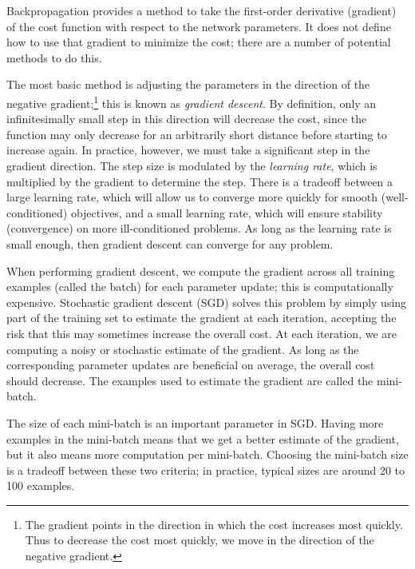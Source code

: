 Backpropagation provides a method to take the first-order derivative (gradient)
of the cost function with respect to the network parameters.
It does not define how to use that gradient to minimize the cost;
there are a number of potential methods to do this.

The most basic method is adjusting the parameters
in the direction of the negative gradient;\footnote{
  The gradient points in the direction in which the cost increases most quickly.
  Thus to decrease the cost most quickly,
  we move in the direction of the negative gradient.}
this is known as \emph{gradient descent}.
By definition, only an infinitesimally small step in this direction
will decrease the cost,
since the function may only decrease for an arbitrarily short distance
before starting to increase again.
In practice, however, we must take a significant step in the gradient direction.
The step size is modulated by the \emph{learning rate},
which is multiplied by the gradient to determine the step.
There is a tradeoff between a large learning rate,
which will allow us to converge more quickly for smooth (well-conditioned) objectives,
and a small learning rate,
which will ensure stability (convergence) on more ill-conditioned problems.
As long as the learning rate is small enough,
then gradient descent can converge for any problem.

When performing gradient descent,
we compute the gradient across all training examples (called the batch)
for each parameter update;
this is computationally expensive.
Stochastic gradient descent (SGD) solves this problem by simply
using part of the training set to estimate the gradient at each iteration,
accepting the risk that this may sometimes increase the overall cost.
At each iteration, we are computing a noisy or stochastic estimate of the gradient.
As long as the corresponding parameter updates are beneficial on average,
the overall cost should decrease.
The examples used to estimate the gradient are called the mini-batch.

The size of each mini-batch is an important parameter in SGD.
Having more examples in the mini-batch means that we get
a better estimate of the gradient,
but it also means more computation per mini-batch.
Choosing the mini-batch size is a tradeoff between these two criteria;
in practice, typical sizes are around 20 to 100 examples.

